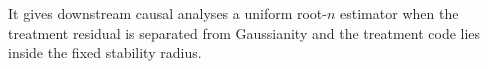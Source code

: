 It gives downstream causal analyses a uniform root-\(n\) estimator when the treatment residual is separated from Gaussianity and the treatment code lies inside the fixed stability radius.
